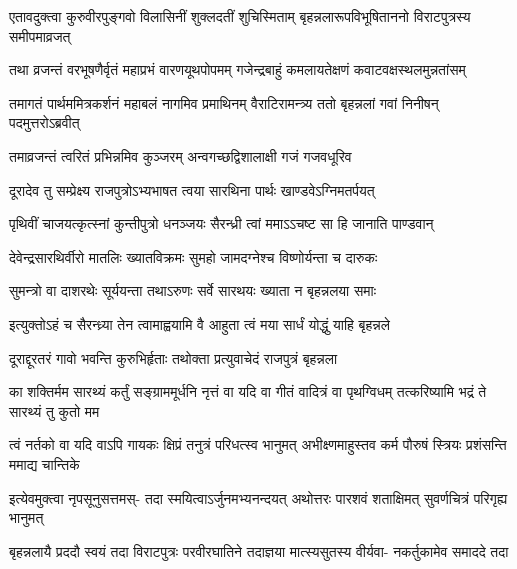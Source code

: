 
\fourlineindentedshloka
{एतावदुक्त्वा कुरुवीरपुङ्गवो}
{विलासिनीं शुक्लदतीं शुचिस्मिताम्}
{बृहन्नलारूपविभूषिताननो}
{विराटपुत्रस्य समीपमाव्रजत्}


\fourlineindentedshloka
{तथा व्रजन्तं वरभूषणैर्वृतं}
{महाप्रभं वारणयूथपोपमम्}
{गजेन्द्रबाहुं कमलायतेक्षणं}
{कवाटवक्षस्थलमुन्नतांसम्}


\fourlineindentedshloka
{तमागतं पार्थममित्रकर्शनं}
{महाबलं नागमिव प्रमाथिनम्}
{वैराटिरामन्त्र्य ततो बृहन्नलां}
{गवां निनीषन् पदमुत्तरोऽब्रवीत्}


\twolineshloka
{तमाव्रजन्तं त्वरितं प्रभिन्नमिव कुञ्जरम्}
{अन्वगच्छद्विशालाक्षी गजं गजवधूरिव}


\twolineshloka
{दूरादेव तु सम्प्रेक्ष्य राजपुत्रोऽभ्यभाषत}
{त्वया सारथिना पार्थः खाण्डवेऽग्निमतर्पयत्}


\twolineshloka
{पृथिवीं चाजयत्कृत्स्नां कुन्तीपुत्रो धनञ्जयः}
{सैरन्ध्री त्वां ममाऽऽचष्ट सा हि जानाति पाण्डवान्}


\twolineshloka
{देवेन्द्रसारथिर्वीरो मातलिः ख्यातविक्रमः}
{सुमहो जामदग्नेश्च विष्णोर्यन्ता च दारुकः}


\twolineshloka
{सुमन्त्रो वा दाशरथेः सूर्ययन्ता तथाऽरुणः}
{सर्वे सारथयः ख्याता न बृहन्नलया समाः}


\twolineshloka
{इत्युक्तोऽहं च सैरन्ध्र्या तेन त्वामाह्वयामि वै}
{आहुता त्वं मया सार्धं योद्धुं याहि बृहन्नले}


\twolineshloka
{दूराद्दूरतरं गावो भवन्ति कुरुभिर्हृताः}
{तथोक्ता प्रत्युवाचेदं राजपुत्रं बृहन्नला}


\threelineshloka
{का शक्तिर्मम सारथ्यं कर्तुं सङ्ग्राममूर्धनि}
{नृत्तं वा यदि वा गीतं वादित्रं वा पृथग्विधम्}
{तत्करिष्यामि भद्रं ते सारथ्यं तु कुतो मम}




\fourlineindentedshloka
{त्वं नर्तको वा यदि वाऽपि गायकः}
{क्षिप्रं तनुत्रं परिधत्स्व भानुमत्}
{अभीक्ष्णमाहुस्तव कर्म पौरुषं}
{स्त्रियः प्रशंसन्ति ममाद्य चान्तिके}



\fourlineindentedshloka
{इत्येवमुक्त्वा नृपसूनुसत्तमस्-}
{तदा स्मयित्वाऽर्जुनमभ्यनन्दयत्}
{अथोत्तरः पारशवं शताक्षिमत्}
{सुवर्णचित्रं परिगृह्य भानुमत्}


\fourlineindentedshloka
{बृहन्नलायै प्रददौ स्वयं तदा}
{विराटपुत्रः परवीरघातिने}
{तदाज्ञया मात्स्यसुतस्य वीर्यवा-}
{नकर्तुकामेव समाददे तदा}




